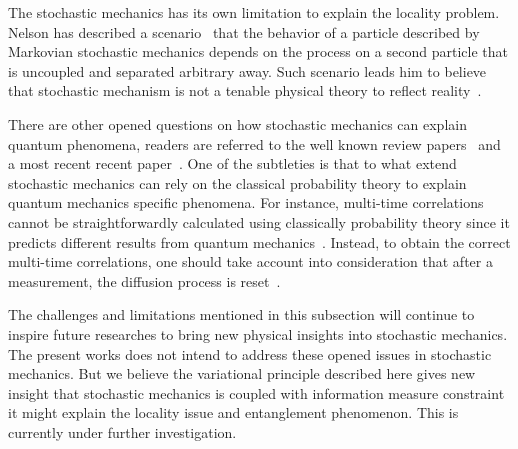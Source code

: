 \documentclass[%
 aip, 
 amsmath,amssymb,amsthm,
 nofootinbib,
 reprint,
]{revtex4-1}
\begin{document}
The stochastic mechanics has its own limitation to explain the locality problem. Nelson has described a scenario~\cite{Nelsonbook} that the behavior of a particle described by Markovian stochastic mechanics depends on the process on a second particle that is uncoupled and separated arbitrary away. Such scenario leads him to believe that stochastic mechanism is not a tenable physical theory to reflect reality~\cite{Nelsonbook}.  

There are other opened questions on how stochastic mechanics can explain quantum phenomena, readers are referred to the well known review papers~\cite{Goldstein, Nelson2} and a most recent recent paper~\cite{Kuipers}. One of the subtleties is that to what extend stochastic mechanics can rely on the classical probability theory to explain quantum mechanics specific phenomena. For instance, multi-time correlations cannot be straightforwardly calculated using classically probability theory since it predicts different results from quantum mechanics~\cite{Grabert}. Instead, to obtain the correct multi-time correlations, one should take account into consideration that after a measurement, the diffusion process is reset~\cite{Blanchard}. 

The challenges and limitations mentioned in this subsection will continue to inspire future researches to bring new physical insights into stochastic mechanics. The present works does not intend to address these opened issues in stochastic mechanics. But we believe the variational principle described here gives new insight that stochastic mechanics is coupled with information measure constraint  it might explain the locality issue and entanglement phenomenon. This is currently under further investigation. 
\end{document}
